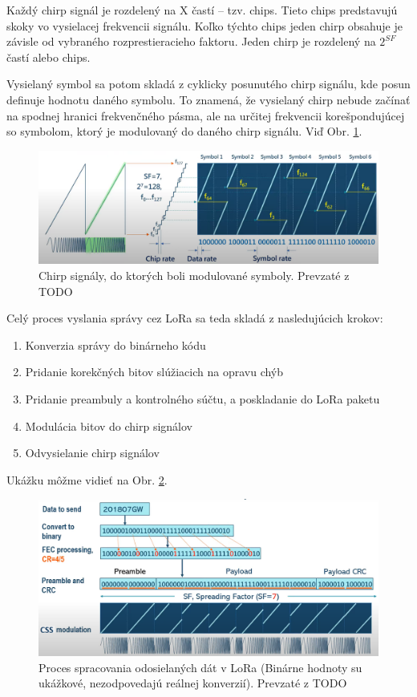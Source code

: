 \documentclass[slovak,master]{diploma}
\begin{document}
Každý chirp signál je rozdelený na X častí -- tzv. chips. Tieto chips predstavujú skoky vo vysielacej frekvencii signálu. 
Koľko týchto chips jeden chirp obsahuje je závisle od vybraného rozprestieracieho faktoru. 
Jeden chirp je rozdelený na $2^{SF}$ častí alebo chips.

Vysielaný symbol sa potom skladá z cyklicky posunutého chirp signálu, kde posun definuje hodnotu daného symbolu. 
To znamená, že vysielaný chirp nebude začínať na spodnej hranici frekvenčného pásma, ale na určitej frekvencii korešpondujúcej so symbolom, 
ktorý je modulovaný do daného chirp signálu. Viď Obr. \ref{fig:loraSymbols}.

\begin{figure}
	\centering
	\includegraphics[width=1\textwidth]{Figures/loraSymbols.png}
	\caption{Chirp signály, do ktorých boli modulované symboly. Prevzaté z TODO}
	\label{fig:loraSymbols}
\end{figure}

Celý proces vyslania správy cez LoRa sa teda skladá z nasledujúcich krokov:
\begin{enumerate}
  \item Konverzia správy do binárneho kódu
  \item Pridanie korekčných bitov slúžiacich na opravu chýb
  \item Pridanie preambuly a kontrolného súčtu, a poskladanie do LoRa paketu
  \item Modulácia bitov do chirp signálov
  \item Odvysielanie chirp signálov
\end{enumerate}
Ukážku môžme vidieť na Obr. \ref{fig:loraModulation}.

\begin{figure}
	\centering
	\includegraphics[width=1\textwidth]{Figures/loraModulation2.png}
	\caption{Proces spracovania odosielaných dát v LoRa (Binárne hodnoty su ukážkové, nezodpovedajú reálnej konverzií). Prevzaté z TODO}
	\label{fig:loraModulation}
\end{figure}
\end{document}
